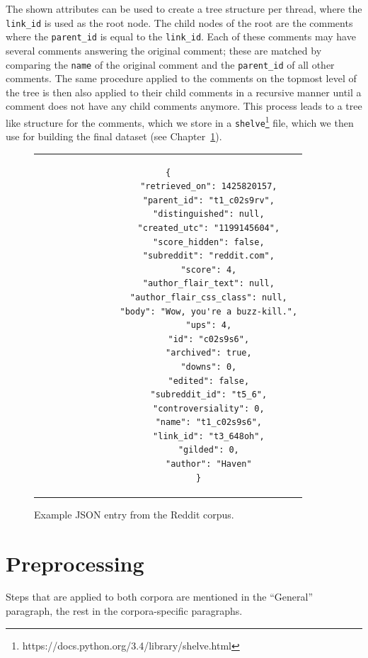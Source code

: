 The shown attributes can be used to create a tree structure per thread, where the \texttt{link\_id} is used as the root node. The child nodes of the root are the comments where the \texttt{parent\_id} is equal to the \texttt{link\_id}. Each of these comments may have several comments answering the original comment; these are matched by comparing the \texttt{name} of the original comment and the \texttt{parent\_id} of all other comments. The same procedure applied to the comments on the topmost level of the tree is then also applied to their child comments in a recursive manner until a comment does not have any child comments anymore. This process leads to a tree like structure for the comments, which we store in a \texttt{shelve}\footnote{https://docs.python.org/3.4/library/shelve.html} file, which we then use for building the final dataset (see Chapter~\ref{data:preprocessing}).
\\
\begin{figure}[thp]
	\centering
	\begin{tabular}{c}  %
		\begin{lstlisting}[style=json]
			{
				"retrieved_on": 1425820157,
				"parent_id": "t1_c02s9rv",
				"distinguished": null,
				"created_utc": "1199145604",
				"score_hidden": false,
				"subreddit": "reddit.com",
				"score": 4,
				"author_flair_text": null,
				"author_flair_css_class": null,
				"body": "Wow, you're a buzz-kill.",
				"ups": 4,
				"id": "c02s9s6",
				"archived": true,
				"downs": 0,
				"edited": false,
				"subreddit_id": "t5_6",
				"controversiality": 0,
				"name": "t1_c02s9s6",
				"link_id": "t3_648oh",
				"gilded": 0,
				"author": "Haven"
			}
		\end{lstlisting}
	\end{tabular}
	\caption{Example JSON entry from the Reddit corpus.}
	\label{data:reddit:json_example}
\end{figure}

\section{Preprocessing}
\label{data:preprocessing}
Steps that are applied to both corpora are mentioned in the ``General'' paragraph, the rest in the corpora-specific paragraphs.

